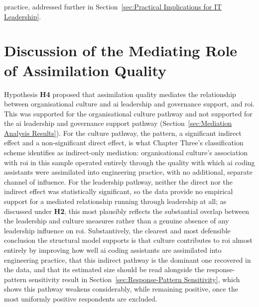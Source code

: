 practice, addressed further in Section~\ref{sec:Practical Implications for IT Leadership}.

\section{Discussion of the Mediating Role of Assimilation Quality}
\label{sec:Discussion H4}
Hypothesis \textbf{H4} proposed that assimilation quality mediates the relationship between organisational culture and \gls{ai} leadership and governance support, and \gls{roi}. This was supported for the organisational culture pathway and not supported for the \gls{ai} leadership and governance support pathway (Section~\ref{sec:Mediation Analysis Results}). For the culture pathway, the pattern, a significant indirect effect and a non-significant direct effect, is what Chapter Three's classification scheme identifies as indirect-only mediation: organisational culture's association with \gls{roi} in this sample operated entirely through the quality with which \gls{ai} coding assistants were assimilated into engineering practice, with no additional, separate channel of influence. For the leadership pathway, neither the direct nor the indirect effect was statistically significant, so the data provide no empirical support for a mediated relationship running through leadership at all; as discussed under \textbf{H2}, this most plausibly reflects the substantial overlap between the leadership and culture measures rather than a genuine absence of any leadership influence on \gls{roi}. Substantively, the clearest and most defensible conclusion the structural model supports is that culture contributes to \gls{roi} almost entirely by improving how well \gls{ai} coding assistants are assimilated into engineering practice, that this indirect pathway is the dominant one recovered in the data, and that its estimated size should be read alongside the response-pattern sensitivity result in Section~\ref{sec:Response-Pattern Sensitivity}, which shows this pathway weakens considerably, while remaining positive, once the most uniformly positive respondents are excluded.

